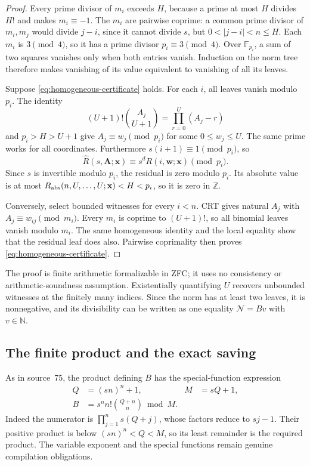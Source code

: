 \begin{proof}
Every prime divisor of \(m_i\) exceeds \(H\), because a prime at most
\(H\) divides \(H!\) and makes \(m_i\equiv-1\).  The \(m_i\) are pairwise
coprime: a common prime divisor of \(m_i,m_j\) would divide \(j-i\), since
it cannot divide \(s\), but \(0<|j-i|<n\le H\).  Each \(m_i\) is
\(3\pmod4\), so it has a prime divisor \(p_i\equiv3\pmod4\).
Over \(\mathbb F_{p_i}\), a sum of two squares vanishes only when both
entries vanish.  Induction on the norm tree therefore makes vanishing of
its value equivalent to vanishing of all its leaves.

Suppose \eqref{eq:homogeneous-certificate} holds.  For each \(i\), all leaves
vanish modulo \(p_i\).  The identity
\[
 (U+1)!\binom{A_j}{U+1}=\prod_{r=0}^{U}(A_j-r)
\]
and \(p_i>H>U+1\) give \(A_j\equiv w_j\pmod{p_i}\) for some
\(0\le w_j\le U\).  The same prime works for all coordinates.
Furthermore \(s(i+1)\equiv1\pmod{p_i}\), so
\[
 \widehat R(s,\mathbf A;\mathbf x)
       \equiv s^dR(i,\mathbf w;\mathbf x)\pmod{p_i}.
\]
Since \(s\) is invertible modulo \(p_i\), the residual is zero modulo
\(p_i\).  Its absolute value is at most
\(R_{\rm abs}(n,U,\ldots,U;\mathbf x)<H<p_i\), so it is zero in
\(\mathbb Z\).

Conversely, select bounded witnesses for every \(i<n\).  CRT gives
natural \(A_j\) with \(A_j\equiv w_{ij}\pmod{m_i}\).  Every \(m_i\) is
coprime to \((U+1)!\), so all binomial leaves vanish modulo \(m_i\).
The same homogeneous identity and the local equality show that the
residual leaf does also.  Pairwise coprimality then proves
\eqref{eq:homogeneous-certificate}.
\end{proof}

The proof is finite arithmetic formalizable in ZFC; it uses no consistency
or arithmetic-soundness assumption.  Existentially quantifying \(U\)
recovers unbounded witnesses at the finitely many indices.  Since the norm
has at least two leaves, it is nonnegative, and its divisibility can be
written as one equality \(\mathcal N=Bv\) with \(v\in\mathbb N\).

\subsection{The finite product and the exact saving}

As in source~75, the product defining \(B\) has the special-function
expression
\begin{align*}
 Q&=(sn)^n+1,& M&=sQ+1,\\
 B&=s^n n!\binom{Q+n}{n}\bmod M.
\end{align*}
Indeed the numerator is \(\prod_{j=1}^{n}s(Q+j)\), whose factors reduce
to \(sj-1\).  Their positive product is below \((sn)^n<Q<M\), so its
least remainder is the required product.  The variable exponent and the
special functions remain genuine compilation obligations.

